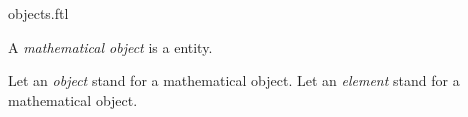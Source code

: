 \documentclass{naproche-library}
\begin{document}
\begin{smodule}[title=Objects]{objects.ftl}

\begin{fakeforthel}
  \begin{signature}
    A \emph{mathematical object} is a entity.
    
    Let an \emph{object} stand for a mathematical object.
    Let an \emph{element} stand for a mathematical object.
  \end{signature}
\end{fakeforthel}
\end{smodule}
\end{document}
